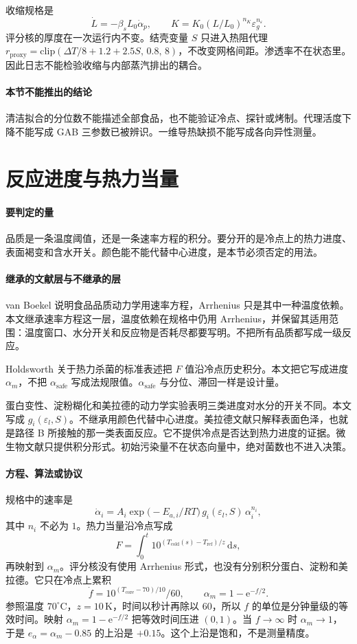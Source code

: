 收缩规格是
\[
\dot L=-\beta_s L_0\dot\alpha_p,\qquad K=K_0(L/L_0)^{n_K}\varepsilon_g^{n_\varepsilon}.
\]
评分核的厚度在一次运行内不变。结壳变量 $S$ 只进入热阻代理 $r_{\mathrm{proxy}}=\mathrm{clip}(\Delta T/8+1.2+2.5 S,\,0.8,\,8)$，不改变网格间距。渗透率不在状态里。因此日志不能检验收缩与内部蒸汽排出的耦合。

\paragraph{本节不能推出的结论}
清洁拟合的分位数不能描述全部食品，也不能验证冷点、探针或烤制。代理活度下降不能写成 GAB 三参数已被辨识。一维导热缺损不能写成各向异性测量。

\section{反应进度与热力当量}

\paragraph{要判定的量}
品质是一条温度阈值，还是一条速率方程的积分。要分开的是冷点上的热力进度、表面褐变和含水开关。颜色能不能代替中心进度，是本节必须否定的用法。

\paragraph{继承的文献层与不继承的层}
van Boekel 说明食品品质动力学用速率方程，Arrhenius 只是其中一种温度依赖\cite{vanboekel2008}。本文继承速率方程这一层，温度依赖在规格中仍用 Arrhenius，并保留其适用范围：温度窗口、水分开关和反应物是否耗尽都要写明。不把所有品质都写成一级反应。

Holdsworth 关于热力杀菌的标准表述把 $F$ 值沿冷点历史积分\cite{holdsworth1997}。本文把它写成进度 $\alpha_m$，不把 $\alpha_{\mathrm{safe}}$ 写成法规限值。$\alpha_{\mathrm{safe}}$ 与分位、滞回一样是设计量。

蛋白变性、淀粉糊化和美拉德的动力学实验表明三类进度对水分的开关不同。本文写成 $g_i(\varepsilon_l,S)$。不继承用颜色代替中心进度。美拉德文献只解释表面色泽，也就是路径 B 所接触的那一类表面反应。它不提供冷点是否达到热力进度的证据。微生物文献只提供积分形式。初始污染量不在状态向量中，绝对菌数也不进入决策。

\paragraph{方程、算法或协议}
规格中的速率是
\[
\dot\alpha_i=A_i\exp\big(-E_{a,i}/RT\big)\,g_i(\varepsilon_l,S)\,\alpha_i^{n_i},
\]
其中 $n_i$ 不必为 $1$。热力当量沿冷点写成
\[
F=\int_0^t 10^{(T_{\mathrm{cold}}(s)-T_{\mathrm{ref}})/z}\,\mathrm{d}s,
\]
再映射到 $\alpha_m$。评分核没有使用 Arrhenius 形式，也没有分别积分蛋白、淀粉和美拉德。它只在冷点上累积
\[
\dot f=10^{(T_{\mathrm{core}}-70)/10}/60,\qquad\alpha_m=1-\mathrm{e}^{-f/2}.
\]
参照温度 $70^\circ\mathrm{C}$，$z=10\,\mathrm{K}$，时间以秒计再除以 $60$，所以 $f$ 的单位是分钟量级的等效时间。映射 $\alpha_m=1-\mathrm{e}^{-f/2}$ 把等效时间压进 $(0,1)$。当 $f\to\infty$ 时 $\alpha_m\to 1$，于是 $e_\alpha=\alpha_m-0.85$ 的上沿是 $+0.15$。这个上沿是饱和，不是测量精度。

